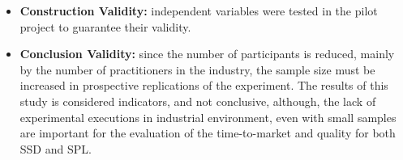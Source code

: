 \begin{itemize}

\item \textbf{Construction Validity:} independent variables were tested in the pilot project to guarantee their validity.

\item \textbf{Conclusion Validity:} since the number of participants is reduced, mainly by the number of practitioners in the industry, the sample size must be increased in prospective replications of the experiment. The results of this study is considered indicators, and not conclusive, although, the lack of experimental executions in industrial environment, even with small samples are important for the evaluation of the time-to-market and quality for both SSD and SPL.

\end{itemize}
